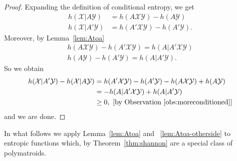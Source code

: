 \documentclass[a4paper,cleveref]{lipics-v2021}
\newcommand{\vset}[1]{\mathcal{#1}}
\begin{document}
%
%
%
%
%
\begin{proof}
	Expanding the definition of conditional entropy, we get 
	\begin{align*}
		h(\vset X|A \vset Y) &= h(A\vset X  \vset Y) - h(A \vset Y)\\
		h(\vset X|A' \vset Y) &= h(A'\vset X  \vset Y) - h(A' \vset Y).
	\end{align*}
	Moreover, by Lemma~\ref{lem:Atoa}
	\begin{align*}
		h(A\vset X \vset Y) - h(A' \vset X  \vset Y) = h(A|A' \vset X \vset Y)\\
		h(A \vset Y) - h(A' \vset Y) = h(A| A' \vset Y ).
	\end{align*}
	So we obtain 
	\begin{align*}
		h(\vset X | A' \vset Y) - h(\vset X | A \vset Y) 
		&= h(A' \vset X  \vset Y) - h(A' \vset Y) -  h(A \vset X \vset Y) + h(A \vset Y)\\
		&= - h(A|A' \vset X \vset Y ) + h(A| A' \vset Y  ) \\
		&\ge 0,  \ \text{[by Observation~\ref{obs:moreconditioned}]}\\
	\end{align*}
	and we are done.
\end{proof}

In what follows we apply Lemma~\ref{lem:Atoa} and ~\ref{lem:Atoa-otherside} to entropic functions which, by Theorem~\ref{thm:shannon} are a special class of polymatroids.
\end{document}
